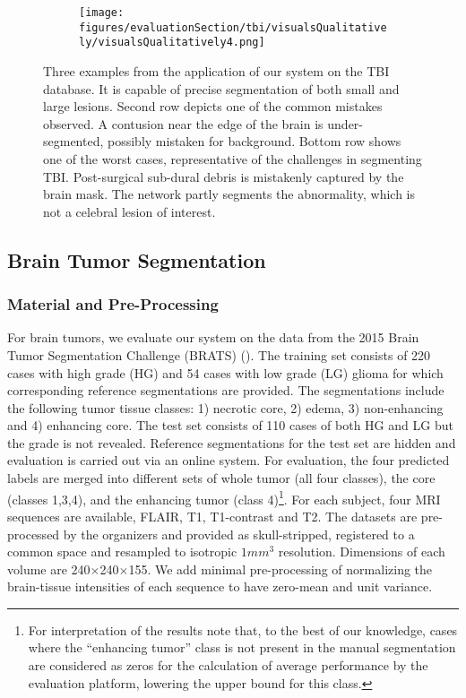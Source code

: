 \documentclass[preprint,authoryear,12pt]{elsarticle}
\newcommand{\quot}[1]{``#1''}
\begin{document}
\begin{figure}[!ht]
\centering
\begin{subfigure}[b]{1.0\textwidth}
	\centering
\texttt{[image: figures/evaluationSection/tbi/visualsQualitatively/visualsQualitatively4.png]}
\end{subfigure}
\vspace{-10pt} \caption{Three examples from the application of our system on the TBI database. It is capable of precise segmentation of both small and large lesions. Second row depicts one of the common mistakes observed. A contusion near the edge of the brain is under-segmented, possibly mistaken for background. Bottom row shows one of the worst cases, representative of the challenges in segmenting TBI. Post-surgical sub-dural debris is mistakenly captured by the brain mask. The network partly segments the abnormality, which is not a celebral lesion of interest.}
\label{fig:evalTbiVisualQuality}
\end{figure}
%
 

\subsection{Brain Tumor Segmentation}
\label{subsec:evalBrats}

\subsubsection{Material and Pre-Processing}

For brain tumors, we evaluate our system on the data from the 2015 Brain Tumor Segmentation Challenge (BRATS) (\cite{Menze2014}). The training set consists of 220 cases with high grade (HG) and 54 cases with low grade (LG) glioma for which corresponding reference segmentations are provided. The segmentations include the following tumor tissue classes: 1) necrotic core, 2) edema, 3) non-enhancing and 4) enhancing core. The test set consists of 110 cases of both HG and LG but the grade is not revealed. Reference segmentations for the test set are hidden and evaluation is carried out via an online system. For evaluation, the four predicted labels are merged into different sets of whole tumor (all four classes), the core (classes 1,3,4), and the enhancing tumor (class 4)\footnote{For interpretation of the results note that, to the best of our knowledge, cases where the \quot{enhancing tumor} class is not present in the manual segmentation are considered as zeros for the calculation of average performance by the evaluation platform, lowering the upper bound for this class.}. For each subject, four MRI sequences are available, FLAIR, T1, T1-contrast and T2. The datasets are pre-processed by the organizers and provided as skull-stripped, registered to a common space and resampled to isotropic $1mm^3$ resolution. Dimensions of each volume are 240$\times$240$\times$155. We add minimal pre-processing of normalizing the brain-tissue intensities of each sequence to have zero-mean and unit variance.
\end{document}

